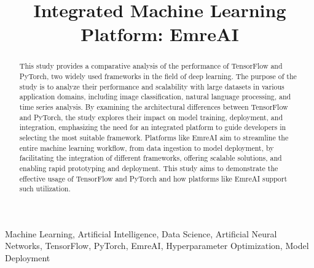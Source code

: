 \documentclass[conference]{IEEEtran}
\begin{document}

%
\title{Integrated Machine Learning Platform: EmreAI\\}

\author{
\IEEEauthorblockA{\\
\\
\\
\\
\\
}
}


%


\maketitle


\begin{abstract}
This study provides a comparative analysis of the performance of TensorFlow and PyTorch, two widely used frameworks in the field of deep learning. The purpose of the study is to analyze their performance and scalability with large datasets in various application domains, including image classification, natural language processing, and time series analysis. By examining the architectural differences between TensorFlow and PyTorch, the study explores their impact on model training, deployment, and integration, emphasizing the need for an integrated platform to guide developers in selecting the most suitable framework. Platforms like EmreAI aim to streamline the entire machine learning workflow, from data ingestion to model deployment, by facilitating the integration of different frameworks, offering scalable solutions, and enabling rapid prototyping and deployment. This study aims to demonstrate the effective usage of TensorFlow and PyTorch and how platforms like EmreAI support such utilization.

\end{abstract}
\begin{IEEEkeywords}
Machine Learning, Artificial Intelligence, Data Science, Artificial Neural Networks, TensorFlow, PyTorch, EmreAI, Hyperparameter Optimization, Model Deployment
\end{IEEEkeywords}
\end{document}
